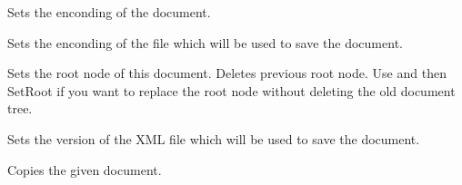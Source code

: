 Sets the enconding of the document.

\label{wxxmldocumentsetfileencoding}


Sets the enconding of the file which will be used to save the document.

\label{wxxmldocumentsetroot}


Sets the root node of this document. Deletes previous root node.
Use  and then SetRoot if you want to
replace the root node without deleting the old document tree.

\label{wxxmldocumentsetversion}


Sets the version of the XML file which will be used to save the document.

\label{wxxmldocumentoperatorassign}


Copies the given document.

